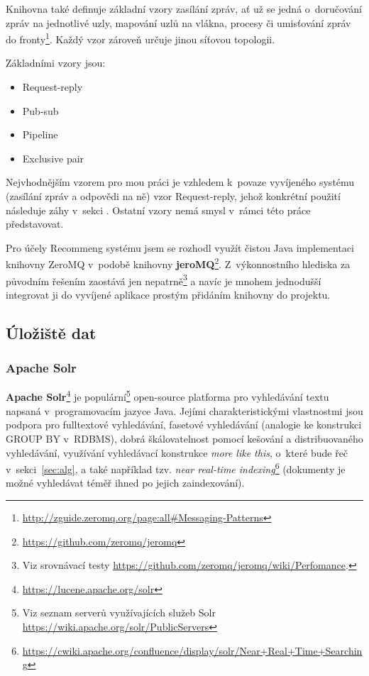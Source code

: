 \documentclass[thesis=M,czech]{FITthesis}[2014/05/07]
\begin{document}
Knihovna také definuje základní vzory zasílání zpráv, ať už se jedná o~doručování zpráv na jednotlivé uzly, mapování uzlů na vlákna, procesy či umisťování zpráv do fronty\footnote{\url{http://zguide.zeromq.org/page:all\#Messaging-Patterns}}. Každý vzor zároveň určuje jinou síťovou topologii.

Základními vzory jsou:

\begin{itemize}
	\item Request-reply
	\item Pub-sub
	\item Pipeline		
	\item Exclusive pair
\end{itemize}

Nejvhodnějším vzorem pro mou práci je vzhledem k~povaze vyvíjeného systému (zasílání zpráv a odpovědi na ně) vzor Request-reply, jehož konkrétní použití následuje záhy v~sekci . Ostatní vzory nemá smysl v~rámci této práce představovat.

Pro účely Recommeng systému jsem se rozhodl využít čistou Java implementaci knihovny ZeroMQ v~podobě knihovny \textbf{jeroMQ}\footnote{\url{https://github.com/zeromq/jeromq}}. Z~výkonnostního hlediska za původním řešením zaostává jen nepatrně\footnote{Viz srovnávací testy \url{https://github.com/zeromq/jeromq/wiki/Perfomance}.} a navíc je mnohem jednodušší integrovat ji do vyvíjené aplikace prostým přidáním knihovny do projektu.

\subsection{Úložiště dat}

\subsubsection{Apache Solr}
\textbf{Apache Solr}\footnote{\url{https://lucene.apache.org/solr}} je populární\footnote{Viz seznam serverů využívajících služeb Solr \url{https://wiki.apache.org/solr/PublicServers}} open-source platforma pro vyhledávání textu napsaná v~programovacím jazyce Java. Jejími charakteristickými vlastnostmi jsou podpora pro fulltextové vyhledávání, fasetové vyhledávání (analogie ke konstrukci GROUP BY v~RDBMS), dobrá škálovatelnost pomocí kešování a distribuovaného vyhledávání, využívání vyhledávací konstrukce \emph{more like this}, o~které bude řeč v~sekci~\ref{sec:alg}, a také například tzv. \emph{near real-time indexing}\footnote{\url{https://cwiki.apache.org/confluence/display/solr/Near+Real+Time+Searching}} (dokumenty je možné vyhledávat téměř ihned po jejich zaindexování).
\end{document}
